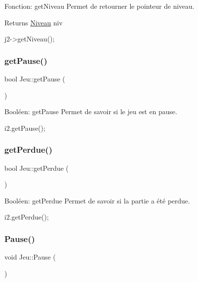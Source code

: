 Fonction\+: get\+Niveau Permet de retourner le pointeur de niveau. 

\begin{DoxyReturn}{Returns}
\hyperlink{classNiveau}{Niveau} niv 
\begin{DoxyCode}
j2->getNiveau();
\end{DoxyCode}
 
\end{DoxyReturn}
\mbox{\label{classJeu_abcee93768971be5db133648851a0219e}} 
\subsubsection{\texorpdfstring{get\+Pause()}{getPause()}}
{\footnotesize\ttfamily bool Jeu\+::get\+Pause (\begin{DoxyParamCaption}{ }\end{DoxyParamCaption})}



Booléen\+: get\+Pause Permet de savoir si le jeu est en pause. 


\begin{DoxyCode}
i2.getPause();
\end{DoxyCode}
 \mbox{\label{classJeu_a344c165558c9ab3aa815404179351156}} 
\subsubsection{\texorpdfstring{get\+Perdue()}{getPerdue()}}
{\footnotesize\ttfamily bool Jeu\+::get\+Perdue (\begin{DoxyParamCaption}{ }\end{DoxyParamCaption})}



Booléen\+: get\+Perdue Permet de savoir si la partie a été perdue. 


\begin{DoxyCode}
i2.getPerdue();
\end{DoxyCode}
 \mbox{\label{classJeu_a825bd1ef8b91c70e468966f6985a2ee3}} 
\subsubsection{\texorpdfstring{Pause()}{Pause()}}
{\footnotesize\ttfamily void Jeu\+::\+Pause (\begin{DoxyParamCaption}{ }\end{DoxyParamCaption})}



